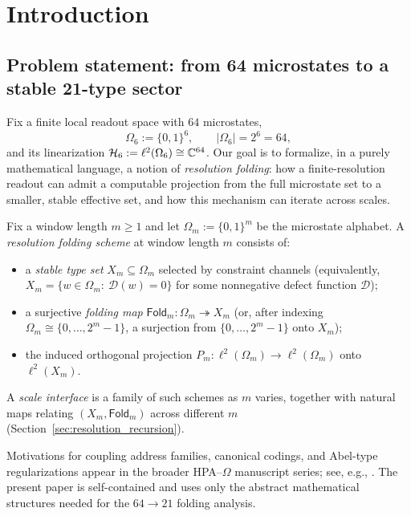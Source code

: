 
\section{Introduction}
\label{sec:introduction}

\subsection{Problem statement: from 64 microstates to a stable 21-type sector}
Fix a finite local readout space with $64$ microstates,
\[
\Omega_6:=\{0,1\}^6,\qquad |\Omega_6|=2^6=64,
\]
and its linearization $\mathcal{H}_6:=\ell^2(\Omega_6)\cong \mathbb{C}^{64}$.
Our goal is to formalize, in a purely mathematical language, a notion of \emph{resolution folding}:
how a finite-resolution readout can admit a computable projection from the full microstate set to a smaller, stable effective set, and how this mechanism can iterate across scales.

\begin{definition}
\label{def:resolution_folding_scheme}
Fix a window length $m\ge 1$ and let $\Omega_m:=\{0,1\}^m$ be the microstate alphabet.
A \emph{resolution folding scheme} at window length $m$ consists of:
\begin{itemize}
\item a \emph{stable type set} $X_m\subseteq \Omega_m$ selected by constraint channels (equivalently, $X_m=\{w\in\Omega_m:\ \mathcal{D}(w)=0\}$ for some nonnegative defect function $\mathcal{D}$);
\item a surjective \emph{folding map} $\mathsf{Fold}_m:\Omega_m\twoheadrightarrow X_m$ (or, after indexing $\Omega_m\cong\{0,\dots,2^m-1\}$, a surjection from $\{0,\dots,2^m-1\}$ onto $X_m$);
\item the induced orthogonal projection $P_m:\ell^2(\Omega_m)\to \ell^2(\Omega_m)$ onto $\ell^2(X_m)$.
\end{itemize}
A \emph{scale interface} is a family of such schemes as $m$ varies, together with natural maps relating $(X_m,\mathsf{Fold}_m)$ across different $m$ (Section~\ref{sec:resolution_recursion}).
\end{definition}

\begin{remark}
Motivations for coupling address families, canonical codings, and Abel-type regularizations appear in the broader HPA--$\Omega$ manuscript series; see, e.g., \cite{Ma2025HPA,Ma2025HPOT,Ma2025FoP}.
The present paper is self-contained and uses only the abstract mathematical structures needed for the $64\to 21$ folding analysis.
\end{remark}


